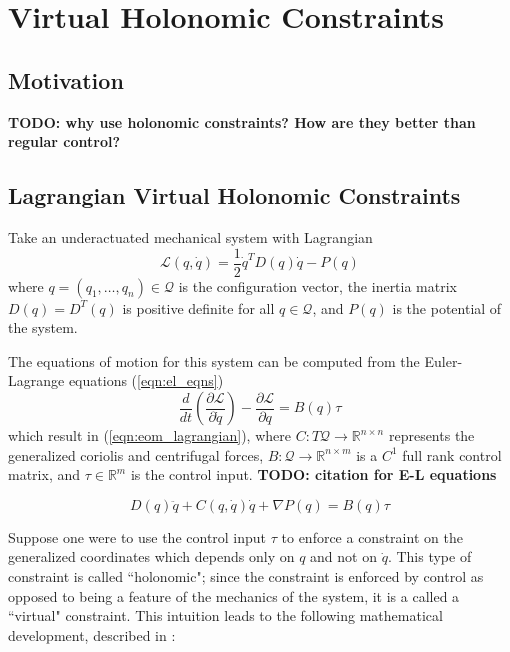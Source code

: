 
\section{Virtual Holonomic Constraints}\label{sec:vhcs}

\subsection{Motivation}
\textbf{TODO: why use holonomic constraints? 
How are they better than regular control?}

\subsection{Lagrangian Virtual Holonomic Constraints}
Take an underactuated mechanical system with Lagrangian
\begin{equation}\label{eqn:lagrangian}
\mathcal{L}(q,\dot{q}) = \frac{1}{2} \dot{q}^T D(q) \dot{q} - P(q)
\end{equation}
where \(q = (q_1,\ldots,q_n) \in \mathcal{Q}\) is the configuration vector, 
the inertia matrix \(D(q) = D^T(q)\) is positive definite for all 
\(q \in \mathcal{Q}\), and \(P(q)\) is the potential of the system.

The equations of motion for this system can be computed from 
the Euler-Lagrange equations (\ref{eqn:el_eqns})
\begin{equation}\label{eqn:el_eqns}
   \frac{d}{dt} \left( \frac{\partial \mathcal{L}}{\partial \dot{q}}\right) -
   \frac{\partial \mathcal{L}}{\partial q} = B(q)\tau
\end{equation}
which result in (\ref{eqn:eom_lagrangian}), where
\(C : T\mathcal{Q} \rightarrow \mathbb{R}^{n \times n}\) represents the
generalized coriolis and centrifugal forces,
\(B : \mathcal{Q} \rightarrow \mathbb{R}^{n \times m}\) is a 
\(C^1\) full rank control matrix, and \(\tau \in \mathbb{R}^{m}\) is the control 
input. \textbf{TODO: citation for E-L equations}

\begin{equation}\label{eqn:eom_lagrangian}
D(q)\ddot{q} + C(q,\dot{q})\dot{q} + \nabla P(q) = B(q)\tau
\end{equation}

Suppose one were to use the control input \(\tau\) to enforce a
constraint on the generalized coordinates which depends only on \(q\) and not on
\(\dot{q}\). This type of constraint is called ``holonomic"; since the 
constraint is enforced by control as opposed to being a feature of the mechanics
of the system, it is a called a ``virtual" constraint. 
This intuition leads to the following mathematical development, described in 
\cite{vhcs_for_el_systems}:

